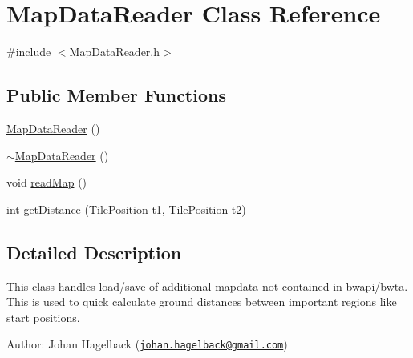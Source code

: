 \hypertarget{class_map_data_reader}{\section{Map\-Data\-Reader Class Reference}
\label{class_map_data_reader}
}


{\ttfamily \#include $<$Map\-Data\-Reader.\-h$>$}

\subsection*{Public Member Functions}
\begin{DoxyCompactItemize}
\item 
\hyperlink{class_map_data_reader_a866267d875d20a6e857e12f3397fc00c}{Map\-Data\-Reader} ()
\item 
\hyperlink{class_map_data_reader_a470305a21ae79188fd548fddc5654bab}{$\sim$\-Map\-Data\-Reader} ()
\item 
void \hyperlink{class_map_data_reader_afb679d46684faa606b8dabd2a5742700}{read\-Map} ()
\item 
int \hyperlink{class_map_data_reader_ade89e244559a1cd09395643fc1a7bcd5}{get\-Distance} (Tile\-Position t1, Tile\-Position t2)
\end{DoxyCompactItemize}


\subsection{Detailed Description}
This class handles load/save of additional mapdata not contained in bwapi/bwta. This is used to quick calculate ground distances between important regions like start positions.

Author\-: Johan Hagelback (\href{mailto:johan.hagelback@gmail.com}{\tt johan.\-hagelback@gmail.\-com}) 

